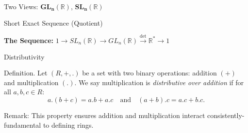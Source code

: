 \documentclass[11pt,aspectratio=43,ignorenonframetext,t]{beamer}
\begin{document}
\begin{frame}{Two Views: $\mathbf{GL_n(\mathbb{R})}$, $\mathbf{SL_n(\mathbb{R})}$}

\begin{block}{Short Exact Sequence (Quotient)}
\begin{center}
\end{center}
\vspace*{0.5em}
\textbf{The Sequence:} $1 \to SL_n(\mathbb{R}) \to GL_n(\mathbb{R}) \xrightarrow{\det} \mathbb{R}^* \to 1$
\end{block}


\end{frame}


\begin{frame}{Distributivity}
\begin{block}{Definition.}  
Let $(R,+,.)$ be a set with two binary operations: addition $(+)$ and multiplication $(.)$.  
We say multiplication is \emph{distributive over addition} if for all $a,b,c\in R$:
\[
a.(b+c) = a.b + a.c \quad \text{and} \quad (a+b).c = a.c + b.c.
\]
\end{block}
\begin{block}{Remark:}
This property ensures addition and multiplication interact consistently-fundamental to defining rings.
\end{block}
\end{frame}
\end{document}
